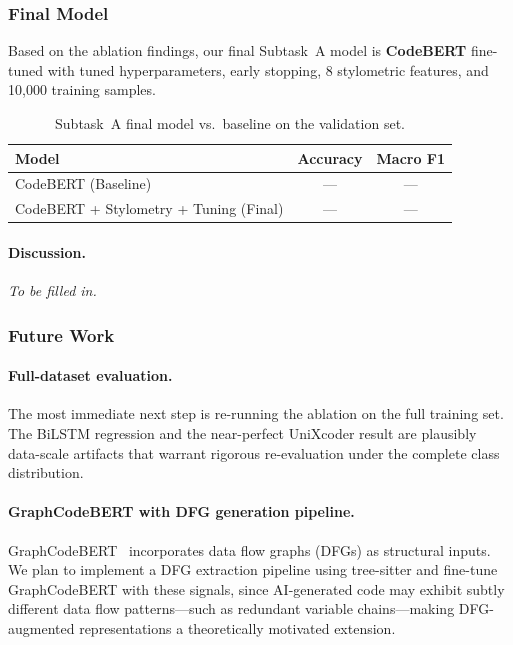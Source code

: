 \documentclass[11pt]{article}
\begin{document}
\subsubsection{Final Model}

Based on the ablation findings, our final Subtask~A model is \textbf{CodeBERT} fine-tuned with tuned hyperparameters, early stopping, 8 stylometric features, and 10,000 training samples.

\begin{table}[htbp]
\centering
\small
\begin{tabular}{lcc}
\toprule
\textbf{Model} & \textbf{Accuracy} & \textbf{Macro F1} \\
\midrule
CodeBERT (Baseline) & --- & --- \\
CodeBERT + Stylometry + Tuning (Final) & --- & --- \\
\bottomrule
\end{tabular}
\caption{Subtask~A final model vs.\ baseline on the validation set.}
\label{tab:taskA_final}
\end{table}

\paragraph{Discussion.} \textit{To be filled in.}

\subsubsection{Future Work}

\paragraph{Full-dataset evaluation.}
The most immediate next step is re-running the ablation on the full training set. The BiLSTM regression and the near-perfect UniXcoder result are plausibly data-scale artifacts that warrant rigorous re-evaluation under the complete class distribution.

\paragraph{GraphCodeBERT with DFG generation pipeline.}
GraphCodeBERT~\cite{guo2021graphcodebert} incorporates data flow graphs (DFGs) as structural inputs. We plan to implement a DFG extraction pipeline using tree-sitter and fine-tune GraphCodeBERT with these signals, since AI-generated code may exhibit subtly different data flow patterns---such as redundant variable chains---making DFG-augmented representations a theoretically motivated extension.
\end{document}
